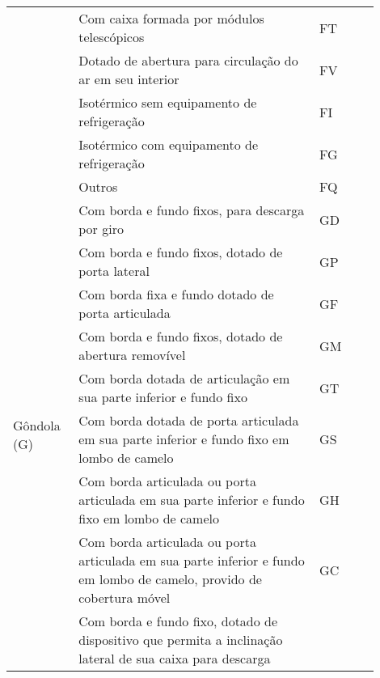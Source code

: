 \begin{longtable}{p{0.15\linewidth}p{0.6\linewidth}p{0.15\linewidth}}
                                            & Com caixa formada por módulos telescópicos                & FT \\
                                            & Dotado de abertura para circulação do ar em seu interior  & FV \\
                                            & Isotérmico sem equipamento de refrigeração                & FI \\
                                            & Isotérmico com equipamento de refrigeração                & FG \\
                                            & Outros                                                    & FQ \\ \midrule
        \multirow{10}{2.5cm}{Gôndola (G)}   & Com borda e fundo fixos, para descarga por giro           & GD \\
                                            & Com borda e fundo fixos, dotado de porta lateral          & GP \\
                                            & Com borda fixa e fundo dotado de porta articulada         & GF \\
                                            & Com borda e fundo fixos, dotado de abertura removível     & GM \\
                                            & Com borda dotada de articulação em sua parte inferior 
                                                e fundo fixo                                            & GT \\
                                            & Com borda dotada de porta articulada em sua parte inferior
                                                e fundo fixo em lombo de camelo                         & GS \\
                                            & Com borda articulada ou porta articulada em sua parte
                                                    inferior e fundo fixo em lombo de camelo            & GH \\
                                            & Com borda articulada ou porta articulada em sua parte
                                            inferior e fundo em lombo de camelo, provido de cobertura
                                            móvel                                                       & GC \\
                                            & Com borda e fundo fixo, dotado de dispositivo que
                                                permita a inclinação lateral de sua caixa para descarga

\end{longtable}
